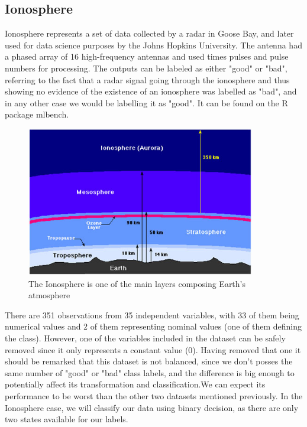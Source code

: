 \documentclass[12pt]{report}
\begin{document}
\subsection{Ionosphere}

Ionosphere represents a set of data collected by a radar in Goose Bay, and later used for data science purposes by the Johns Hopkins University. The antenna had a phased array of 16 high-frequency antennas and used times pulses and pulse numbers for processing. The outputs can be labeled as either "good" or "bad", referring to the fact that a radar signal going through the ionosphere and thus showing no evidence of the existence of an ionosphere was labelled as "bad", and in any other case we would be labelling it as "good". It can be found on the R package mlbench. \newline

\begin{figure}[H]
	\centering
	\includegraphics[width=10cm]{Figuras_tfg/Ionosphere}
	\caption{The Ionosphere is one of the main layers composing Earth's atmosphere}
	\label{fig:figure_pairs_iris}
\end{figure}

There are 351 observations from 35 independent variables, with 33 of them being numerical values and 2 of them representing nominal values (one of them defining the class). However, one of the variables included in the dataset can be safely removed since it only represents a constant value (0). Having removed that one it should be remarked that this dataset is not balanced, since we don't posses the same number of "good" or "bad" class labels, and the difference is big enough to potentially affect its transformation and classification.We can expect its performance to be worst than the other two datasets mentioned previously. In the Ionosphere case, we will classify our data using binary decision, as there are only two states available for our labels. \par
\end{document}
